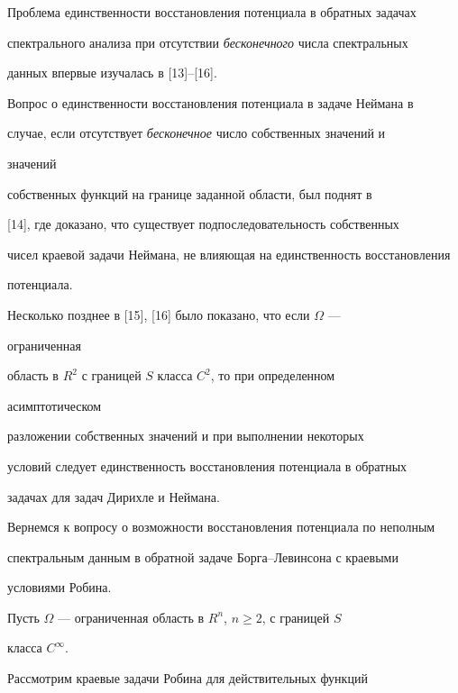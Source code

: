  


Проблема единственности восстановления потенциала в обратных задачах 


спектрального анализа при отсутствии {\it бесконечного} числа спектральных 


данных впервые изучалась в [13]--[16]. 


 


Вопрос о единственности восстановления потенциала в задаче Неймана в 


случае, если отсутствует {\it бесконечное} число собственных значений и 


значений 


собственных функций на границе заданной области, был поднят в 


[14], где доказано, что существует подпоследовательность собственных 


чисел краевой задачи Неймана, не влияющая на единственность восстановления 


потенциала. 


 


Несколько позднее в [15], [16] было показано, что если $\Omega$ --- 


ограниченная 


область в $R^2$ с границей $S$ класса $C^2$, то при определенном 


асимптотическом 


разложении собственных значений и при выполнении некоторых 


условий следует единственность восстановления потенциала в обратных 


задачах для задач Дирихле и Неймана. 


 


Вернемся к вопросу о возможности восстановления потенциала по неполным 


спектральным данным в обратной задаче Борга--Левинсона с краевыми 


условиями Робина. 


 


Пусть $\Omega$ --- ограниченная область в $R^n$, $n\ge2$, с границей $S$ 


класса $C^\infty$. 





Рассмотрим краевые задачи Робина для действительных функций 


